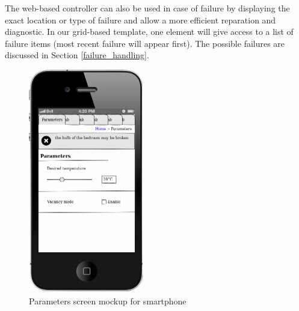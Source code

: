 \documentclass{acm_proc_article-sp}
\begin{document}
The web-based controller can also be used in case of failure by displaying the exact location or type of failure and allow a more efficient reparation and diagnostic.
In our grid-based template, one element will give access to a list of failure items (most recent failure will appear first).
The possible failures are discussed in Section \ref{failure_handling}.
				\begin{figure}[htb]
  				\begin{center}
    				\includegraphics[width=5cm]{mockup}
    				\caption{Parameters screen mockup for smartphone\label{mockup}}
  				\end{center}
				\end{figure}
\end{document}
